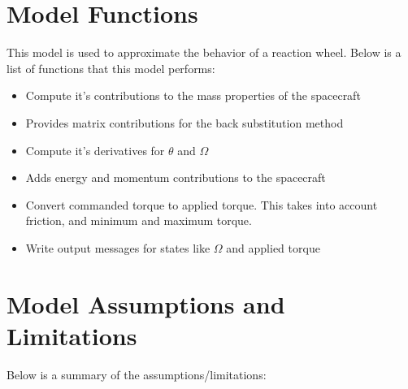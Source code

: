 \section{Model Functions}

This model is used to approximate the behavior of a reaction wheel. Below is a list of functions that this model performs:

\begin{itemize}
	\item Compute it's contributions to the mass properties of the spacecraft
	\item Provides matrix contributions for the back substitution method
	\item Compute it's derivatives for $\theta$ and $\Omega$
	\item Adds energy and momentum contributions to the spacecraft
	\item Convert commanded torque to applied torque. This takes into account friction, and minimum and maximum torque.
	\item Write output messages for states like $\Omega$ and applied torque
\end{itemize}

\section{Model Assumptions and Limitations}
Below is a summary of the assumptions/limitations:

